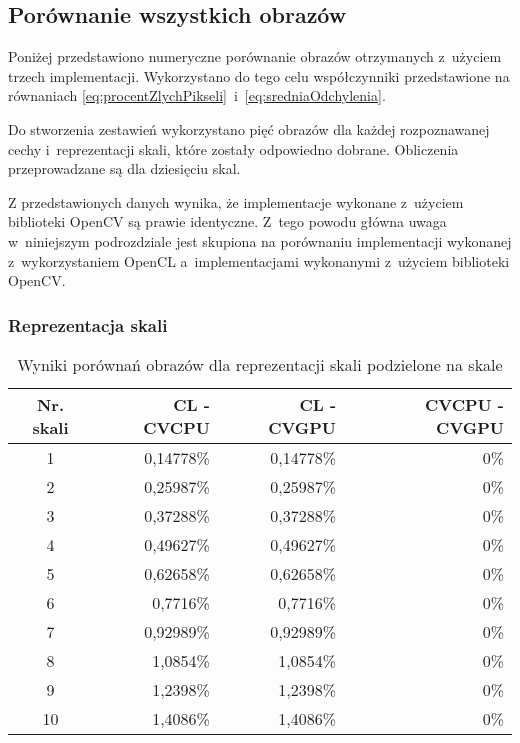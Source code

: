 \subsection{Porównanie wszystkich obrazów}
\label{subsec:porownanieNumerycznePoprawnosc}

Poniżej przedstawiono numeryczne porównanie obrazów otrzymanych z~użyciem trzech implementacji. Wykorzystano do tego celu współczynniki przedstawione na równaniach \ref{eq:procentZlychPikseli}~i~\ref{eq:sredniaOdchylenia}.

Do stworzenia zestawień wykorzystano pięć obrazów dla każdej rozpoznawanej cechy i~reprezentacji skali, które zostały odpowiedno dobrane. Obliczenia przeprowadzane są dla dziesięciu skal.

Z przedstawionych danych wynika, że implementacje wykonane z~użyciem biblioteki OpenCV są prawie identyczne. Z~tego powodu główna uwaga w~niniejszym podrozdziale jest skupiona na porównaniu implementacji wykonanej z~wykorzystaniem OpenCL a~implementacjami wykonanymi z~użyciem biblioteki OpenCV.
\subsubsection{Reprezentacja skali}
\label{subsubsec:reprezentacjaSakliTabele}

\begin{center}
\begin{table}
\centering
\caption{Wyniki porównań obrazów dla reprezentacji skali podzielone na skale}
\label{tab:imageScaleRep}
\begin{tabular}{|c|r|r|r|}
 \hline
Nr. skali & CL - CVCPU & CL - CVGPU & CVCPU - CVGPU \\ \hline
1 & 0,14778\% & 0,14778\% & 0\% \\ \hline
2 & 0,25987\% & 0,25987\% & 0\% \\ \hline
3 & 0,37288\% & 0,37288\% & 0\% \\ \hline
4 & 0,49627\% & 0,49627\% & 0\% \\ \hline
5 & 0,62658\% & 0,62658\% & 0\% \\ \hline
6 & 0,7716\% & 0,7716\% & 0\% \\ \hline
7 & 0,92989\% & 0,92989\% & 0\% \\ \hline
8 & 1,0854\% & 1,0854\% & 0\% \\ \hline
9 & 1,2398\% & 1,2398\% & 0\% \\ \hline
10 & 1,4086\% & 1,4086\% & 0\% \\ \hline
\end{tabular}
\end{table}
\end{center}

